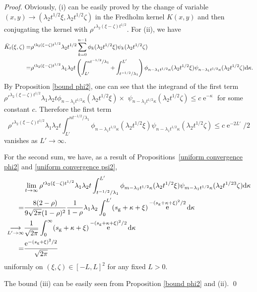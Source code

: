\documentclass[cmp]{svjour}
\numberwithin{theorem}{section}
\numberwithin{equation}{section}
\DeclareMathOperator{\e}{e}
\def\dd{{\rm d}}
\def\i{{\infty}}
\begin{document}
\begin{proof}
Obviously, (i) can be easily proved by the change of variable $(x,y)\rightarrow ( \lambda_2 t^{1/2} \xi, \lambda_2 t^{1/2} \zeta)$ in the Fredholm kernel $K(x,y)$ and then conjugating the kernel with $\rho'^{ \lambda_2 (\xi-\zeta)t^{1/2} }$. For (ii), we have
\begin{align*}
\bar{K}_t (\xi,\zeta)
=&
\rho'^{ \lambda_2 (\xi-\zeta)t^{1/2} }
\lambda_2 t^{1/2}
\sum_{k=0}^{n-1}
\phi_k(\lambda_2 t^{1/2} \xi)
\psi_k(\lambda_2 t^{1/2} \zeta)
\\
=&\rho'^{ \lambda_2 (\xi-\zeta)t^{1/2} }
\lambda_1\lambda_2 t
\left(
\int^{n t^{-1/2} / \lambda_1}_{L'}
+\int^{L'}_{t^{-1/2} / \lambda_1}
\right)
\phi_{n-\lambda_1 t^{1/2} \kappa}(\lambda_2 t^{1/2} \xi)
\psi_{n-\lambda_1 t^{1/2} \kappa}(\lambda_2 t^{1/2} \zeta)
\dd \kappa.
\end{align*}
By Proposition \ref{bound phi2}, one can see that the integrand of the first term $\rho'^{ \lambda_2 (\xi-\zeta)t^{1/2} }
\lambda_1\lambda_2 t\phi_{n-\lambda_1 t^{1/2} \kappa}(\lambda_2 t^{1/2} \xi) \times $ $
\psi_{n-\lambda_1 t^{1/2} \kappa}(\lambda_2 t^{1/2} \zeta) \leq c \e^{-\kappa}$ for some constant $c$. Therefore the first term 
\[
\rho'^{ \lambda_2 (\xi-\zeta)t^{1/2} }
\lambda_1\lambda_2 t
\int_{L'}^{n t^{-1/2}/\lambda_1}
\phi_{n-\lambda_1 t^{1/2} \kappa}(\lambda_2 t^{1/2} \xi)
\psi_{n-\lambda_1 t^{1/2} \kappa}(\lambda_2 t^{1/2} \zeta) \leq c \e^{-2L'}/2
\]
vanishes as $L'\rightarrow \i$.

For the second sum, we have, as a result of Propositions~\ref{uniform convergence phi2} and \eqref{uniform convergence psi2},
\begin{align*}
&\lim_{t\rightarrow \infty}
\rho'^{ \lambda_2 (\xi-\zeta)t^{1/2} }
\lambda_1 \lambda_2 t\int_{t^{-1/2} / \lambda_1}^{L'}
\phi_{m-\lambda_1 t^{1/2}\kappa}(\lambda_2 t^{1/2}\xi)
\psi_{m-\lambda_1 t^{1/2}\kappa}(\lambda_2 t^{1/23}\zeta)
\dd \kappa \\
=&
\frac{8(2-\rho)}{9\sqrt{ 2 \pi}(1-\rho)^2}\frac{1}{1-\rho}
\lambda_1 \lambda_2
\int^{L'}_{0}
(s_{\rm g}+\kappa+\xi)
\e^{-(s_{\rm g}+\kappa+\xi)^2 /2}
\dd \kappa
\\
\underset{ L'\rightarrow\infty }{\longrightarrow}&
\frac{1}{\sqrt{2 \pi}}
\int^{\infty}_{0}
(s_{\rm g}+\kappa+\xi)
\e^{-(s_{\rm g}+\kappa+\xi)^2 /2}
\dd \kappa 
\\
=&
\frac{ \e^{-(s_{\rm g}+\xi)^2 / 2} }{\sqrt{2 \pi}}  
\end{align*}
uniformly on $(\xi,\zeta)\in[-L,L]^2$ for any fixed $L>0$.

The bound (iii) can be easily seen from Proposition \ref{bound phi2} and (ii). \qed
\end{proof}
\end{document}
